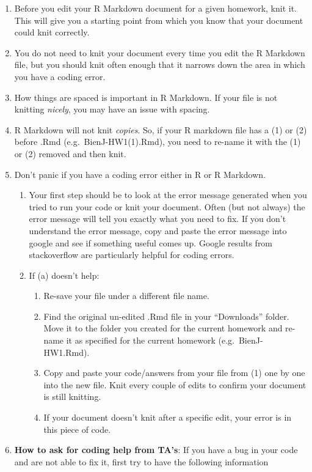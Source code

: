 \documentclass[]{article}
\begin{document}
\begin{enumerate}
\def\labelenumi{\arabic{enumi})}
\item
  Before you edit your R Markdown document for a given homework, knit
  it. This will give you a starting point from which you know that your
  document could knit correctly.
\item
  You do not need to knit your document every time you edit the R
  Markdown file, but you should knit often enough that it narrows down
  the area in which you have a coding error.
\item
  How things are spaced is important in R Markdown. If your file is not
  knitting \emph{nicely}, you may have an issue with spacing.
\item
  R Markdown will not knit \emph{copies}. So, if your R markdown file
  has a (1) or (2) before .Rmd (e.g.~BienJ-HW1(1).Rmd), you need to
  re-name it with the (1) or (2) removed and then knit.
\item
  Don't panic if you have a coding error either in R or R Markdown.

  \begin{enumerate}
  \def\labelenumii{\alph{enumii})}
  \item
    Your first step should be to look at the error message generated
    when you tried to run your code or knit your document. Often (but
    not always) the error message will tell you exactly what you need to
    fix. If you don't understand the error message, copy and paste the
    error message into google and see if something useful comes up.
    Google results from stackoverflow are particularly helpful for
    coding errors.
  \item
    If (a) doesn't help:

    \begin{enumerate}
    \def\labelenumiii{\roman{enumiii}.}
    \item
      Re-save your file under a different file name.
    \item
      Find the original un-edited .Rmd file in your ``Downloads''
      folder. Move it to the folder you created for the current homework
      and re-name it as specified for the current homework
      (e.g.~BienJ-HW1.Rmd).
    \item
      Copy and paste your code/answers from your file from (1) one by
      one into the new file. Knit every couple of edits to confirm your
      document is still knitting.\\
    \item
      If your document doesn't knit after a specific edit, your error is
      in this piece of code.
    \end{enumerate}
  \end{enumerate}
\item
  \textbf{How to ask for coding help from TA's}: If you have a bug in
  your code and are not able to fix it, first try to have the following
  information


\end{enumerate}
\end{document}
